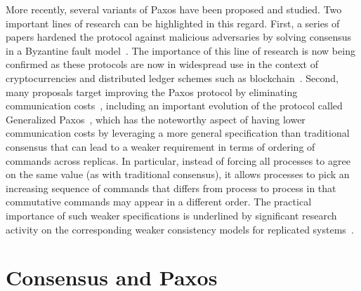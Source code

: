 More recently, several variants of Paxos have been proposed and
studied. Two important lines of research can be highlighted in this
regard. First, a series of papers hardened the protocol against
malicious adversaries by solving consensus in a Byzantine fault
model~\cite{Martin2006,Lamport2011}. The importance of this line of
research is now being confirmed as these protocols are now in widespread
use in the context of cryptocurrencies and distributed ledger
schemes such as blockchain~\cite{bitcoin}.
Second, many proposals target improving
the Paxos protocol by eliminating communication costs~\cite{L06},
including an important evolution of the protocol called Generalized
Paxos~\cite{Lamport2005}, which has the noteworthy aspect of
having lower communication costs by leveraging a more general specification than traditional consensus 
that can lead to a weaker requirement in terms of ordering of commands across replicas. In particular, instead of forcing all
processes to agree on the same value (as with traditional consensus), it allows processes to pick an
increasing sequence of commands that differs from process to process
in that commutative commands may appear in a different order.
The practical importance of such weaker specifications is underlined
by significant research activity on the corresponding weaker consistency
models for replicated systems~\cite{LLS90,dynamo}.\par

\section{Consensus and Paxos}

